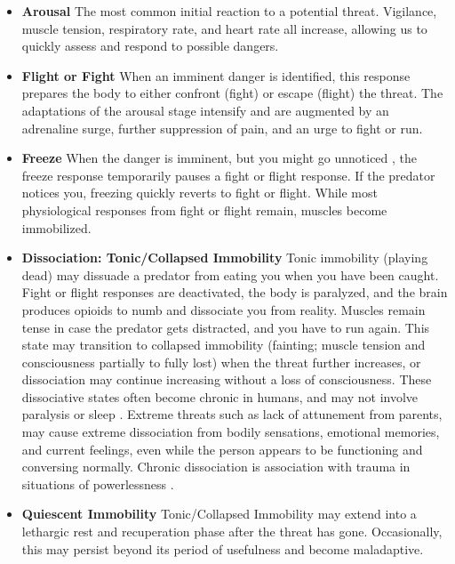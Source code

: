 \documentclass[12pt,letterpaper]{article}
\begin{document}
\begin{itemize}
    \item \textbf{Arousal} The most common initial reaction to a potential threat. Vigilance, muscle tension, respiratory rate, and heart rate all increase, allowing us to quickly assess and respond to possible dangers.
    \item \textbf{Flight or Fight} When an imminent danger is identified, this response prepares the body to either confront (fight) or escape (flight) the threat. The adaptations of the arousal stage intensify and are augmented by an adrenaline surge, further suppression of pain, and an urge to fight or run.
    \item \textbf{Freeze} When the danger is imminent, but you might go unnoticed , the freeze response temporarily pauses a fight or flight response. If the predator notices you, freezing quickly reverts to fight or flight. While most physiological responses from fight or flight remain, muscles become immobilized.
    \item \textbf{Dissociation: Tonic/Collapsed Immobility} Tonic immobility (playing dead) may dissuade a predator from eating you when you have been caught. Fight or flight responses are deactivated, the body is paralyzed, and the brain produces opioids to numb and dissociate you from reality. Muscles remain tense in case the predator gets distracted, and you have to run again. This state may transition to collapsed immobility (fainting; muscle tension and consciousness partially to fully lost) when the threat further increases, or dissociation may continue increasing without a loss of consciousness. These dissociative states often become chronic in humans, and may not involve paralysis or sleep \cite{razviPSIP}. Extreme threats such as lack of attunement from parents, may cause extreme dissociation from bodily sensations, emotional memories, and current feelings, even while the person appears to be functioning and conversing normally. Chronic dissociation is association with trauma in situations of powerlessness \cite{loewensteinDissociation}. 
    \item \textbf{Quiescent Immobility} Tonic/Collapsed Immobility may extend into a lethargic rest and recuperation phase after the threat has gone. Occasionally, this may persist beyond its period of usefulness and become maladaptive.
\end{itemize}
\end{document}
